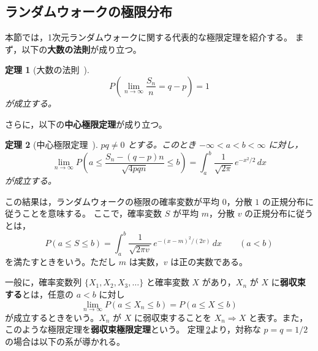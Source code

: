 \documentclass[a4j,dvipdfmx]{jsarticle}
\theoremstyle{plainnote}
\newtheorem{theorem}{定理}[section]
\begin{document}
\subsection{ランダムウォークの極限分布}

本節では，1次元ランダムウォークに関する代表的な極限定理を紹介する。
まず，以下の\textbf{大数の法則}が成り立つ。

\begin{theorem}[大数の法則~{\cite{refbook}}]
\label{thm:lln}
\begin{equation}
  P\!\left(\lim_{n \to \infty} \frac{S_n}{n} = q - p\right) = 1
  \label{eq:lln}
\end{equation}
が成立する。
\end{theorem}

さらに，以下の\textbf{中心極限定理}が成り立つ。

\begin{theorem}[中心極限定理~{\cite{refbook}}]
\label{thm:clt}
$pq \neq 0$ とする。このとき $-\infty < a < b < \infty$ に対し，
\begin{equation}
  \lim_{n \to \infty} P\!\left(a \leq \frac{S_n - (q-p)n}{\sqrt{4pqn}} \leq b\right)
  = \int_a^b \frac{1}{\sqrt{2\pi}}\,e^{-x^2/2}\,dx
  \label{eq:clt}
\end{equation}
が成立する。
\end{theorem}

この結果は，ランダムウォークの極限の確率変数が平均 $0$，分散 $1$ の正規分布に従うことを意味する。
ここで，確率変数 $S$ が平均 $m$，分散 $v$ の正規分布に従うとは，
\begin{equation}
  P(a \leq S \leq b) = \int_a^b \frac{1}{\sqrt{2\pi v}}\,e^{-(x-m)^2/(2v)}\,dx
  \qquad (a < b)
  \label{eq:normal_def}
\end{equation}
を満たすときをいう。ただし $m$ は実数，$v$ は正の実数である。

一般に，確率変数列 $\{X_1, X_2, X_3, \ldots\}$ と確率変数 $X$ があり，$X_n$ が $X$ に\textbf{弱収束する}とは，任意の $a < b$ に対し
\begin{equation}
  \lim_{n \to \infty} P(a \leq X_n \leq b) = P(a \leq X \leq b)
  \label{eq:weak_conv}
\end{equation}
が成立するときをいう。$X_n$ が $X$ に弱収束することを $X_n \Rightarrow X$ と表す。また，このような極限定理を\textbf{弱収束極限定理}という。
定理\,\ref{thm:clt}より，対称な $p = q = 1/2$ の場合は以下の系が導かれる。
\end{document}
